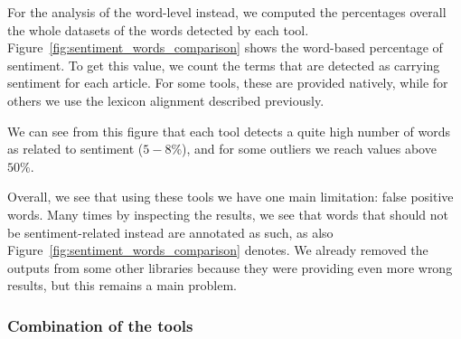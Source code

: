 For the analysis of the word-level instead, we computed the percentages overall the whole datasets of the words detected by each tool.
Figure~\ref{fig:sentiment_words_comparison} shows the word-based percentage of sentiment. To get this value, we count the terms that are detected as carrying sentiment for each article.
For some tools, these are provided natively, while for others we use the lexicon alignment described previously.

We can see from this figure that each tool detects a quite high number of words as related to sentiment ($5-8\%$), and for some outliers we reach values above $50\%$.




Overall, we see that using these tools we have one main limitation: false positive words. Many times by inspecting the results, we see that words that should not be sentiment-related instead are annotated as such, as also Figure~\ref{fig:sentiment_words_comparison} denotes.
We already removed the outputs from some other libraries because they were providing even more wrong results, but this remains a main problem.


\subsubsection{\statusgreen Combination of the tools}

